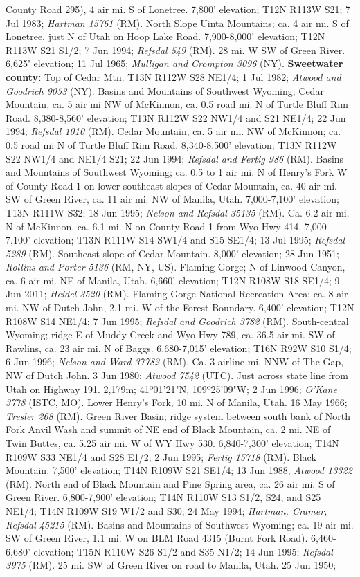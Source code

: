 County Road 295), 4 air mi. S of Lonetree. 7,800' elevation; T12N R113W S21; 7 Jul 1983; \textit{Hartman 15761} (RM).  North Slope Uinta Mountains; ca. 4 air mi. S of Lonetree, just N of Utah on Hoop Lake Road. 7,900-8,000' elevation; T12N R113W S21 S1/2; 7 Jun 1994; \textit{Refsdal 549} (RM).  28 mi. W SW of Green River. 6,625’ elevation; 11 Jul 1965; \textit{Mulligan and Crompton 3096} (NY).  \textbf{Sweetwater county:} Top of Cedar Mtn. T13N R112W S28 NE1/4; 1 Jul 1982; \textit{Atwood and Goodrich 9053} (NY).  Basins and Mountains of Southwest Wyoming; Cedar Mountain, ca. 5 air mi NW of McKinnon, ca. 0.5 road mi. N of Turtle Bluff Rim Road. 8,380-8,560' elevation; T13N R112W S22 NW1/4 and S21 NE1/4; 22 Jun 1994; \textit{Refsdal 1010} (RM).  Cedar Mountain, ca. 5 air mi. NW of McKinnon; ca. 0.5 road mi N of Turtle Bluff Rim Road. 8,340-8,500' elevation; T13N R112W S22 NW1/4 and NE1/4 S21; 22 Jun 1994; \textit{Refsdal and Fertig 986} (RM).  Basins and Mountains of Southwest Wyoming; ca. 0.5 to 1 air mi. N of Henry's Fork W of County Road 1 on lower southeast slopes of Cedar Mountain, ca. 40 air mi. SW of Green River, ca. 11 air mi. NW of Manila, Utah. 7,000-7,100' elevation; T13N R111W S32; 18 Jun 1995; \textit{Nelson and Refsdal 35135} (RM).  Ca. 6.2 air mi. N of McKinnon, ca. 6.1 mi. N on County Road 1 from Wyo Hwy 414. 7,000-7,100' elevation; T13N R111W S14 SW1/4 and S15 SE1/4; 13 Jul 1995; \textit{Refsdal 5289} (RM).  Southeast slope of Cedar Mountain. 8,000' elevation; 28 Jun 1951; \textit{Rollins and Porter 5136} (RM, NY, US).  Flaming Gorge; N of Linwood Canyon, ca. 6 air mi. NE of Manila, Utah. 6,660' elevation; T12N R108W S18 SE1/4; 9 Jun 2011; \textit{Heidel 3520} (RM).  Flaming Gorge National Recreation Area; ca. 8 air mi. NW of Dutch John, 2.1 mi. W of the Forest Boundary. 6,400' elevation; T12N R108W S14 NE1/4; 7 Jun 1995; \textit{Refsdal and Goodrich 3782} (RM).  South-central Wyoming; ridge E of Muddy Creek and Wyo Hwy 789, ca. 36.5 air mi. SW of Rawlins, ca. 23 air mi. N of Baggs. 6,680-7,015' elevation; T16N R92W S10 S1/4; 6 Jun 1996; \textit{Nelson and Ward 37782} (RM).  Ca. 3 airline mi. NNW of The Gap, NW of Dutch John.	3 Jun 1980; \textit{Atwood 7542} (UTC).  Just across state line from Utah on Highway 191. 2,179m; 41º01'21"N, 109º25'09"W; 2 Jun 1996; \textit{O'Kane 3778} (ISTC, MO).  Lower Henry's Fork, 10 mi. N of Manila, Utah. 16 May 1966; \textit{Tresler 268} (RM).  Green River Basin; ridge system between south bank of North Fork Anvil Wash and summit of NE end of Black Mountain, ca. 2 mi. NE of Twin Buttes, ca. 5.25 air mi. W of WY Hwy 530.  6,840-7,300' elevation; T14N R109W S33 NE1/4 and S28 E1/2; 2 Jun 1995; \textit{Fertig 15718} (RM).  Black Mountain. 7,500' elevation; T14N R109W S21 SE1/4; 13 Jun 1988; \textit{Atwood 13322} (RM).  North end of Black Mountain and Pine Spring area, ca. 26 air mi. S of Green River. 6,800-7,900' elevation; T14N R110W S13 S1/2, S24, and S25 NE1/4; T14N R109W S19 W1/2 and S30; 24 May 1994; \textit{Hartman, Cramer, Refsdal 45215} (RM).  Basins and Mountains of Southwest Wyoming; ca. 19 air mi. SW of Green River, 1.1 mi. W on BLM Road 4315 (Burnt Fork Road).  6,460-6,680' elevation; T15N R110W S26 S1/2 and S35 N1/2; 14 Jun 1995; \textit{Refsdal 3975} (RM). 25 mi. SW of Green River on road to Manila, Utah. 25 Jun 1950; 